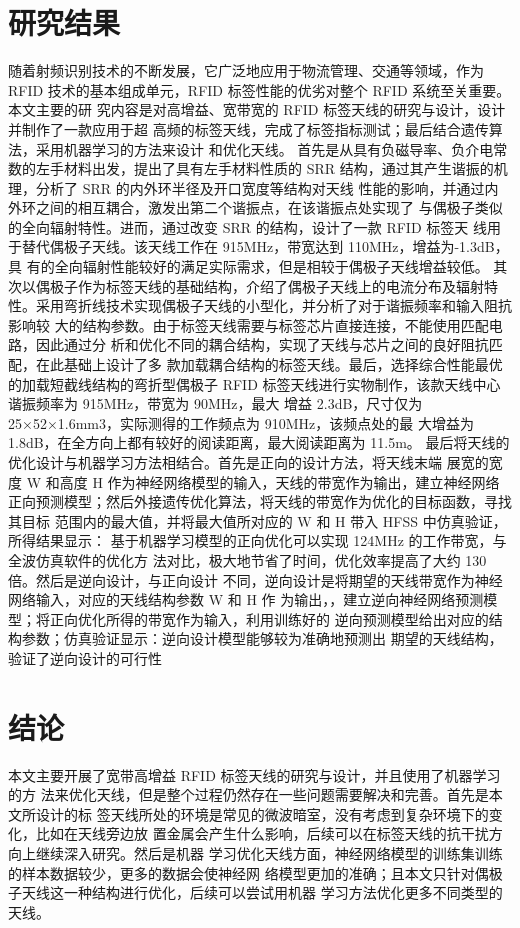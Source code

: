 \documentclass{article}
\begin{document}
	\section{研究结果}
随着射频识别技术的不断发展，它广泛地应用于物流管理、交通等领域，作为 RFID
技术的基本组成单元，RFID 标签性能的优劣对整个 RFID 系统至关重要。本文主要的研
究内容是对高增益、宽带宽的 RFID 标签天线的研究与设计，设计并制作了一款应用于超
高频的标签天线，完成了标签指标测试；最后结合遗传算法，采用机器学习的方法来设计
和优化天线。
首先是从具有负磁导率、负介电常数的左手材料出发，提出了具有左手材料性质的
SRR 结构，通过其产生谐振的机理，分析了 SRR 的内外环半径及开口宽度等结构对天线
性能的影响，并通过内外环之间的相互耦合，激发出第二个谐振点，在该谐振点处实现了
与偶极子类似的全向辐射特性。进而，通过改变 SRR 的结构，设计了一款 RFID 标签天
线用于替代偶极子天线。该天线工作在 915MHz，带宽达到 110MHz，增益为-1.3dB，具
有的全向辐射性能较好的满足实际需求，但是相较于偶极子天线增益较低。
其次以偶极子作为标签天线的基础结构，介绍了偶极子天线上的电流分布及辐射特
性。采用弯折线技术实现偶极子天线的小型化，并分析了对于谐振频率和输入阻抗影响较
大的结构参数。由于标签天线需要与标签芯片直接连接，不能使用匹配电路，因此通过分
析和优化不同的耦合结构，实现了天线与芯片之间的良好阻抗匹配，在此基础上设计了多
款加载耦合结构的标签天线。最后，选择综合性能最优的加载短截线结构的弯折型偶极子
RFID 标签天线进行实物制作，该款天线中心谐振频率为 915MHz，带宽为 90MHz，最大
增益 2.3dB，尺寸仅为 25×52×1.6mm3，实际测得的工作频点为 910MHz，该频点处的最
大增益为 1.8dB，在全方向上都有较好的阅读距离，最大阅读距离为 11.5m。
最后将天线的优化设计与机器学习方法相结合。首先是正向的设计方法，将天线末端
展宽的宽度 W 和高度 H 作为神经网络模型的输入，天线的带宽作为输出，建立神经网络
正向预测模型；然后外接遗传优化算法，将天线的带宽作为优化的目标函数，寻找其目标
范围内的最大值，并将最大值所对应的 W 和 H 带入 HFSS 中仿真验证，所得结果显示：
基于机器学习模型的正向优化可以实现 124MHz 的工作带宽，与全波仿真软件的优化方
法对比，极大地节省了时间，优化效率提高了大约 130 倍。然后是逆向设计，与正向设计
不同，逆向设计是将期望的天线带宽作为神经网络输入，对应的天线结构参数 W 和 H 作
为输出，，建立逆向神经网络预测模型；将正向优化所得的带宽作为输入，利用训练好的
逆向预测模型给出对应的结构参数；仿真验证显示：逆向设计模型能够较为准确地预测出
期望的天线结构，验证了逆向设计的可行性
	
	\section{结论}
	本文主要开展了宽带高增益 RFID 标签天线的研究与设计，并且使用了机器学习的方
	法来优化天线，但是整个过程仍然存在一些问题需要解决和完善。首先是本文所设计的标
	签天线所处的环境是常见的微波暗室，没有考虑到复杂环境下的变化，比如在天线旁边放
	置金属会产生什么影响，后续可以在标签天线的抗干扰方向上继续深入研究。然后是机器
	学习优化天线方面，神经网络模型的训练集训练的样本数据较少，更多的数据会使神经网
	络模型更加的准确；且本文只针对偶极子天线这一种结构进行优化，后续可以尝试用机器
	学习方法优化更多不同类型的天线。
	
\end{document}
